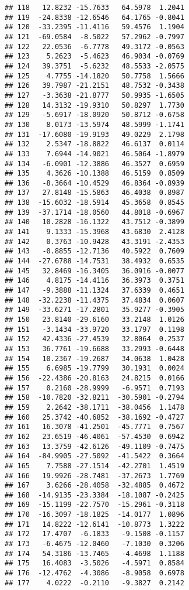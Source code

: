\documentclass[
]{article}
\begin{document}
\begin{verbatim}
## 118   12.8232 -15.7633   64.5978  1.2041
## 119  -24.8338 -12.6546   64.1765 -0.8041
## 120  -33.2395 -11.4116   59.4576  1.1904
## 121  -69.0584  -8.5022   57.2962 -0.7997
## 122   22.0536  -6.7778   49.3172 -0.0563
## 123    5.2623  -5.4623   46.9034 -0.0769
## 124   39.3751  -5.6232   48.5533 -2.0575
## 125    4.7755 -14.1820   50.7758  1.5666
## 126   39.7987 -21.2151   48.7532 -0.3438
## 127   -3.3638 -21.8777   50.9935 -1.6505
## 128   14.3132 -19.9310   50.8297  1.7730
## 129   -5.6917 -18.0920   50.8712 -0.6758
## 130    8.0173 -13.5974   48.5999 -1.1741
## 131  -17.6080 -19.9193   49.0229  2.1798
## 132    2.5347 -18.8822   46.6137  0.0114
## 133    7.6944 -14.9021   46.5064 -1.8979
## 134   -6.0901 -12.3886   46.3527  0.6959
## 135    4.3626 -10.1388   46.5159  0.8509
## 136   -8.3664 -10.4529   46.8364 -0.8939
## 137   27.8148 -15.5863   46.4038  0.8987
## 138  -15.6032 -18.5914   45.3658  0.8545
## 139  -37.1714 -18.0560   44.8018 -0.6967
## 140   10.2828 -16.1322   43.7512 -0.3899
## 141    9.1333 -15.3968   43.6830  2.4128
## 142    0.3763 -10.9428   43.3191 -2.4353
## 143   -0.8855 -12.7136   40.5922  0.7609
## 144  -27.6788 -14.7531   38.4932  0.6535
## 145   32.8469 -16.3405   36.0916 -0.0077
## 146    4.8175 -14.4116   36.3973  0.3751
## 147   -9.3888 -11.1324   37.6339  0.4651
## 148  -32.2238 -11.4375   37.4834  0.0607
## 149  -33.6271 -17.2801   35.9277 -0.3905
## 150   23.8140 -29.6160   33.2148  1.0126
## 151   -3.1434 -33.9720   33.1797  0.1198
## 152   42.4336 -27.4539   32.8064  0.2537
## 153   36.7761 -19.6688   33.2993 -0.6448
## 154   10.2367 -19.2687   34.0638  1.0428
## 155    6.6985 -19.7799   30.1931  0.0024
## 156  -22.4386 -20.8163   24.8215  0.0166
## 157    0.2160 -28.9999   -6.9571  0.7193
## 158  -10.7820 -32.8211  -30.5901 -0.2794
## 159    2.2642 -38.1711  -38.0456  1.1478
## 160   25.3742 -40.6852  -38.1692 -0.4727
## 161   16.3078 -41.2501  -45.7771  0.7567
## 162   23.6519 -46.4061  -57.4530  0.6942
## 163   13.3759 -42.6126  -49.1109 -0.7475
## 164  -84.9905 -27.5092  -41.5422  0.3664
## 165    7.7588 -27.1514  -42.2701  1.4519
## 166   19.9926 -28.7481  -37.2673  1.7769
## 167    3.6266 -28.4058  -32.4885  0.4672
## 168  -14.9135 -23.3384  -18.1087 -0.2425
## 169  -15.1199 -22.7570  -15.2961 -0.3118
## 170  -16.3097 -18.1825  -14.0177  1.0896
## 171   14.8222 -12.6141  -10.8773  1.3222
## 172   17.4707  -6.1833   -9.1508 -0.1157
## 173   -6.4675 -12.0460   -7.1030  0.3206
## 174   54.3186 -13.7465   -4.4698  1.1188
## 175   16.4083  -3.5026   -4.5971  0.8584
## 176  -12.4762  -4.3086   -8.9058  0.6978
## 177    4.0222  -0.2110   -9.3827  0.2142

\end{verbatim}
\end{document}
